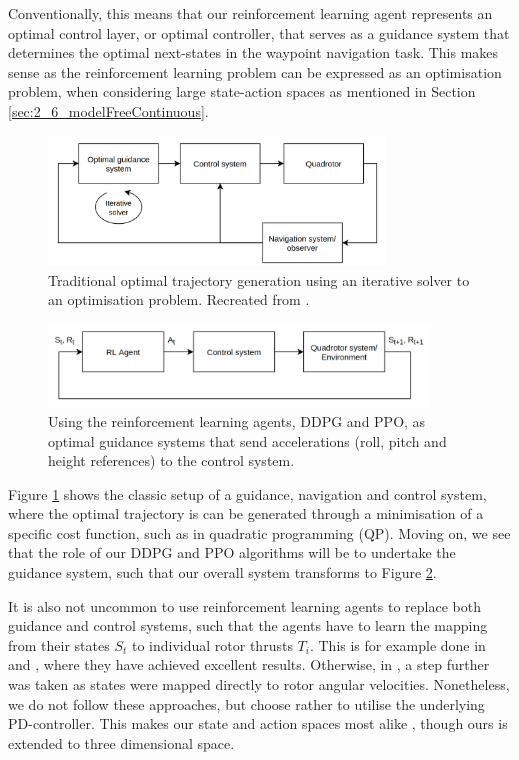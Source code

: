 Conventionally, this means that our reinforcement learning agent represents an optimal control layer, or optimal controller, that serves as a guidance system that determines the optimal next-states in the waypoint navigation task. This makes sense as the reinforcement learning problem can be expressed as an optimisation problem, when considering large state-action spaces as mentioned in Section \ref{sec:2_6_modelFreeContinuous}. 
\begin{figure}[ht]
    \centering
    \includegraphics[width=0.8\textwidth]{figures/4_/4_1_Guidance.png}
    \caption{Traditional optimal trajectory generation using an iterative solver to an optimisation problem. Recreated from \cite{Fossen2021}.}
    \label{fig:4_3_Guidance}
\end{figure}
\begin{figure}[ht]
    \centering
    \includegraphics[width=0.9\textwidth]{figures/4_/4_1_RLGuidance.png}
    \caption{Using the reinforcement learning agents, DDPG and PPO, as optimal guidance systems that send accelerations (roll, pitch and height references) to the control system.}
    \label{fig:4_3_RLGuidance}
\end{figure}

Figure \ref{fig:4_3_Guidance} shows the classic setup of a guidance, navigation and control system, where the optimal trajectory is can be generated through a minimisation of a specific cost function, such as in quadratic programming (QP). Moving on, we see that the role of our DDPG and PPO algorithms will be to undertake the guidance system, such that our overall system transforms to Figure \ref{fig:4_3_RLGuidance}.

It is also not uncommon to use reinforcement learning agents to replace both guidance and control systems, such that the agents have to learn the mapping from their states $S_t$ to individual rotor thrusts $T_i$. This is for example done in \cite{ControlofQuadrotorRL} and \cite{song2021droneRacing}, where they have achieved excellent results. Otherwise, in \cite{PPOQuadrotor}, a step further was taken as states were mapped directly to rotor angular velocities. Nonetheless, we do not follow these approaches, but choose rather to utilise the underlying PD-controller. This makes our state and action spaces most alike \cite{RodriguezRamos2019ADR}, though ours is extended to three dimensional space.

